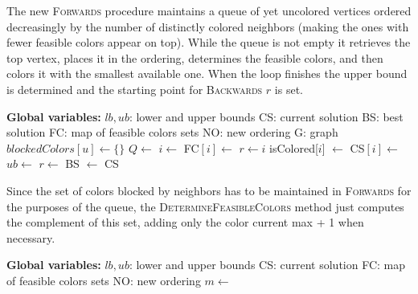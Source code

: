  The new \textsc{Forwards} procedure maintains a queue of yet uncolored vertices ordered decreasingly by the number of distinctly colored neighbors (making the ones with fewer feasible colors appear on top). While the queue is not empty it retrieves the top vertex, places it in the ordering, determines the feasible colors, and then colors it with the smallest available one. When the loop finishes the upper bound is determined and the starting point for \textsc{Backwards} $r$ is set.
 \vspace{10pt}
 \begin{algorithmic}[1]
  \Statex \textbf{Global variables:}
 \Statex $lb, ub$: lower and upper bounds
 \Statex CS: current solution
 \Statex BS: best solution
 \Statex FC: map of feasible colors sets
 \Statex NO: new ordering
 \Statex G: graph
            \ls $blockedColors[u] \gets \{\}$
        \mEndFor
        \ls $Q \gets$  
            \ls $i \gets$ 
            \ls {}
            \ls FC$[i] \gets $ 
                \ls $r \gets i$
                \ls \RETURN
            \mEndIf
            \ls isColored[$i$] $\gets$ \TRUE
            \ls CS$[i] \gets$ 
                \ls {} 
            \mEndFor
        \mEndWhile
        \ls $ub \gets $ 
        \ls $r \gets $ 
        \ls BS $\gets$ CS
	\mEndProcedure
\end{algorithmic}

\vspace{10pt}
Since the set of colors blocked by neighbors has to be maintained in \textsc{Forwards} for the purposes of the queue, the \textsc{DetermineFeasibleColors} method just computes the complement of this set, adding only the color current max + 1 when necessary.
\vspace{10pt}

 \begin{algorithmic}[1]
  \Statex \textbf{Global variables:}
 \Statex $lb, ub$: lower and upper bounds
 \Statex CS: current solution
 \Statex FC: map of feasible colors sets
 \Statex NO: new ordering
        \ls $m \gets$ 
                \ls {}
            \mEndIf
        \mEndFor
	\mEndProcedure
\end{algorithmic}

